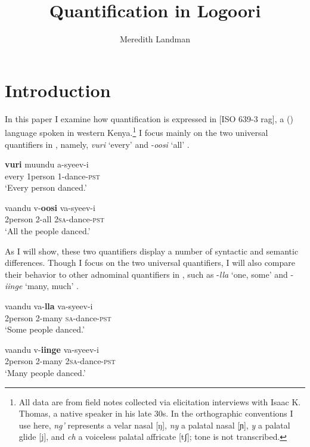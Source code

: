 \documentclass[output=paper]{langsci/langscibook}
\title{Quantification in Logoori}
\author{%
 Meredith Landman \affiliation{Pomona College} 
}
\begin{document}
 
 

\section{Introduction}

In this paper I examine how quantification is expressed in  [ISO 639-3
{rag}], a  () language spoken in western Kenya.\footnote{All data are from field notes collected via elicitation interviews with Isaac K. Thomas, a native  speaker in his late 30s. In the orthographic conventions I use here, \textit{ng'} represents a velar nasal [ŋ], \textit{ny} a palatal nasal [ɲ], \textit{y} a palatal glide [j], and \textit{ch} a voiceless palatal affricate [tʃ]; tone is not transcribed.
} I focus mainly on the two universal quantifiers in , namely, \textit{vuri} ‘every’  and -\textit{oosi} ‘all’ .

\ea\label{ex:landman:1}
\ea\label{ex:landman:1a}
\gll \textbf{vuri}  muundu  a-syeev-i\\
     every  1person  1-dance-\textsc{pst}\\
\glt ‘Every person danced.’

\ex\label{ex:landman:1b}
\gll   vaandu  v-\textbf{oosi}    va-syeev-i\\
     2person  2-all    2\textsc{sa}-dance-\textsc{pst}\\
\glt ‘All the people danced.’
\z
\z

As I will show, these two quantifiers display a number of syntactic and semantic differences. Though I focus on the two universal quantifiers, I will also compare their behavior to other adnominal quantifiers in , such as -\textit{lla} ‘one, some’  and -\textit{iinge} ‘many, much’ .


\ea\label{ex:landman:2} 
\ea\label{ex:landman:2a} 
\gll   vaandu  va-\textbf{lla}    va-syeev-i\\
       2person	2-many            \textsc{sa}-dance-\textsc{pst}\\
\glt ‘Some people danced.’


\ex\label{ex:landman:2b} 
 \gll vaandu  v-\textbf{iinge}  va-syeev-i\\
     2person  2-many  2\textsc{sa}-dance-\textsc{pst}\\
\glt ‘Many people danced.’\\
\z
\z
\end{document}
